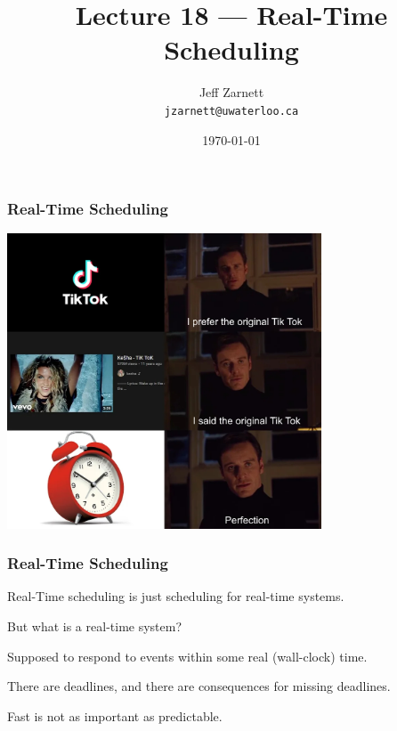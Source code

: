 

\title{Lecture 18 --- Real-Time Scheduling}

\author{Jeff Zarnett \\ \small \texttt{jzarnett@uwaterloo.ca}}
\date{\today}




\begin{frame}
  \titlepage

 \end{frame}
 
\begin{frame}
\frametitle{Real-Time Scheduling}


\begin{center}
	\includegraphics[width=0.7\textwidth]{images/tiktok.jpg}
\end{center}

\end{frame}

\begin{frame}
\frametitle{Real-Time Scheduling}

Real-Time scheduling is just scheduling for real-time systems.

But what is a real-time system?

Supposed to respond to events within some real (wall-clock) time. 

There are deadlines, and there are consequences for missing deadlines. 

Fast is not as important as predictable.

\end{frame}


